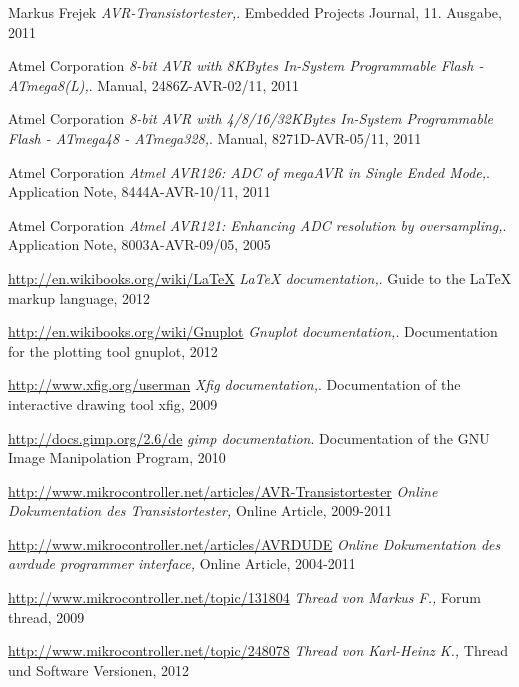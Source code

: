 \documentclass[12pt,a4paper,oneside,english]{report}
\begin{document}
\begin{thebibliography}{99}

Markus Frejek
\emph{AVR-Transistortester,}.
Embedded Projects Journal,
11. Ausgabe,
2011

Atmel Corporation
\emph{8-bit AVR with 8KBytes In-System Programmable Flash - ATmega8(L),}.
Manual,
2486Z-AVR-02/11,
2011

Atmel Corporation
\emph{8-bit AVR with 4/8/16/32KBytes In-System Programmable Flash - ATmega48 - ATmega328,}.
Manual,
8271D-AVR-05/11,
2011

Atmel Corporation
\emph{Atmel AVR126: ADC of megaAVR in Single Ended Mode,}.
Application Note,
8444A-AVR-10/11,
2011

Atmel Corporation
\emph{Atmel AVR121: Enhancing ADC resolution by oversampling,}.
Application Note,
8003A-AVR-09/05,
2005

\url{http://en.wikibooks.org/wiki/LaTeX}
\emph{LaTeX documentation,}.
Guide to the LaTeX markup language,
2012

\url{http://en.wikibooks.org/wiki/Gnuplot}
\emph{Gnuplot documentation,}.
Documentation for the plotting tool gnuplot,
2012

\url{http://www.xfig.org/userman}
\emph{Xfig documentation,}.
Documentation of the interactive drawing tool xfig,
2009

\url{http://docs.gimp.org/2.6/de}
\emph{gimp documentation}.
Documentation of the GNU Image Manipolation Program,
2010

\url{http://www.mikrocontroller.net/articles/AVR-Transistortester}
\emph{Online Dokumentation des Transistortester,}
Online Article,
2009-2011

\url{http://www.mikrocontroller.net/articles/AVRDUDE}
\emph{Online Dokumentation des avrdude programmer interface,}
Online Article,
2004-2011

\url{http://www.mikrocontroller.net/topic/131804}
\emph{Thread von Markus F.,}
Forum thread, 
2009

\url{http://www.mikrocontroller.net/topic/248078}
\emph{Thread von Karl-Heinz K.,}
Thread und Software Versionen,
2012


\end{thebibliography}
\end{document}
